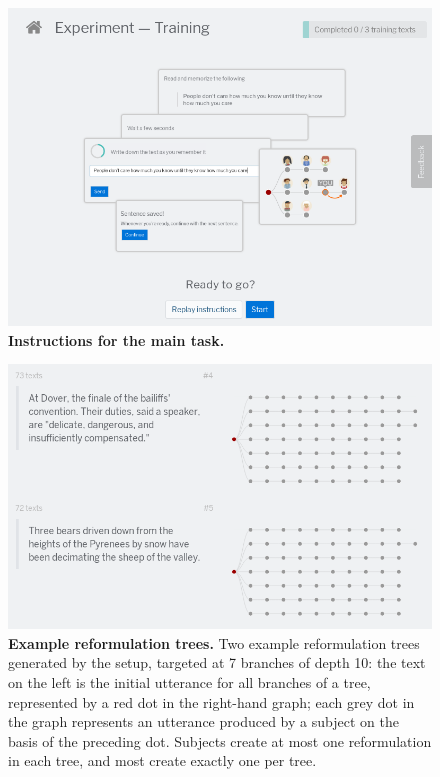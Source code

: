 \documentclass[a4paper,fleqn]{cas-dc}
\begin{document}
\begin{figure}
  \centering
  \includegraphics[width=.85\linewidth]{images/manual/gistr-instructions-training.png}
  \caption[Instructions for the main task]{
  \textbf{Instructions for the main task.}
  }
  \label{fig:gistr-instructions}
\end{figure}

\begin{figure}
  \centering
  \includegraphics[width=.85\linewidth]{images/manual/gistr-trees.png}
  \caption[Example reformulation trees]{
  \textbf{Example reformulation trees.}
  Two example reformulation trees generated by the setup, targeted at 7 branches of depth 10:
  the text on the left is the initial utterance for all branches of a tree, represented by a red dot in the right-hand graph; each grey dot in the graph represents an utterance produced by a subject on the basis of the preceding dot.
  Subjects create at most one reformulation in each tree, and most create exactly one per tree.
  }
  \label{fig:gistr-trees}
\end{figure}
\end{document}
